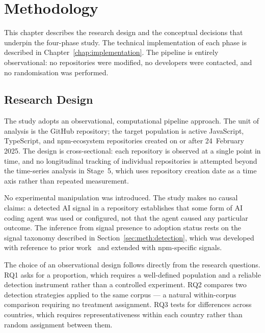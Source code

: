 
\chapter{Methodology}
\label{chap:methodology}

This chapter describes the research design and the conceptual decisions that underpin the four-phase study. The technical implementation of each phase is described in Chapter~\ref{chap:implementation}. The pipeline is entirely observational: no repositories were modified, no developers were contacted, and no randomisation was performed.

\section{Research Design}
\label{sec:meth:design}

The study adopts an observational, computational pipeline approach. The unit of analysis is the GitHub repository; the target population is active JavaScript, TypeScript, and npm-ecosystem repositories created on or after 24~February 2025. The design is cross-sectional: each repository is observed at a single point in time, and no longitudinal tracking of individual repositories is attempted beyond the time-series analysis in Stage~5, which uses repository creation date as a time axis rather than repeated measurement.

No experimental manipulation was introduced. The study makes no causal claims: a detected AI signal in a repository establishes that some form of AI coding agent was used or configured, not that the agent caused any particular outcome. The inference from signal presence to adoption status rests on the signal taxonomy described in Section~\ref{sec:meth:detection}, which was developed with reference to prior work~\cite{robbesHeuristics2026, galsterConfig2026} and extended with npm-specific signals.

The choice of an observational design follows directly from the research questions. RQ1 asks for a proportion, which requires a well-defined population and a reliable detection instrument rather than a controlled experiment. RQ2 compares two detection strategies applied to the same corpus --- a natural within-corpus comparison requiring no treatment assignment. RQ3 tests for differences across countries, which requires representativeness within each country rather than random assignment between them.


